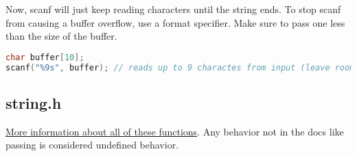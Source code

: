 Now, scanf will just keep reading characters until the string ends. To stop scanf from causing a buffer
overflow, use a format specifier. Make sure to pass one less than the size of the buffer.

\begin{lstlisting}[language=C]
char buffer[10];
scanf("%9s", buffer); // reads up to 9 charactes from input (leave room for the 10th byte to be the terminating byte)
\end{lstlisting}

\subsection{string.h}

\href{https://linux.die.net/man/3/string}{More information about all of these functions}. Any behavior not in the docs like passing  is considered undefined behavior.


